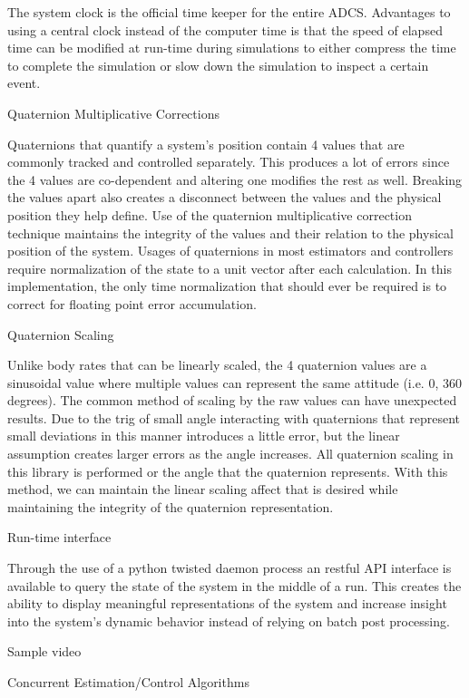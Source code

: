 The system clock is the official time keeper for the entire ADCS. Advantages to using a central clock instead of the computer time is that the speed of elapsed time can be modified at run-time during simulations to either compress the time to complete the simulation or slow down the simulation to inspect a certain event.

Quaternion Multiplicative Corrections

Quaternions that quantify a system's position contain 4 values that are commonly tracked and controlled separately. This produces a lot of errors since the 4 values are co-dependent and altering one modifies the rest as well. Breaking the values apart also creates a disconnect between the values and the physical position they help define. Use of the quaternion multiplicative correction technique maintains the integrity of the values and their relation to the physical position of the system. Usages of quaternions in most estimators and controllers require normalization of the state to a unit vector after each calculation. In this implementation, the only time normalization that should ever be required is to correct for floating point error accumulation.

Quaternion Scaling

Unlike body rates that can be linearly scaled, the 4 quaternion values are a sinusoidal value where multiple values can represent the same attitude (i.e. 0, 360 degrees). The common method of scaling by the raw values can have unexpected results. Due to the trig of small angle interacting with quaternions that represent small deviations in this manner introduces a little error, but the linear assumption creates larger errors as the angle increases. All quaternion scaling in this library is performed or the angle that the quaternion represents. With this method, we can maintain the linear scaling affect that is desired while maintaining the integrity of the quaternion representation.

Run-time interface

Through the use of a python twisted daemon process an restful API interface is available to query the state of the system in the middle of a run. This creates the ability to display meaningful representations of the system and increase insight into the system's dynamic behavior instead of relying on batch post processing.

Sample video

Concurrent Estimation/Control Algorithms

